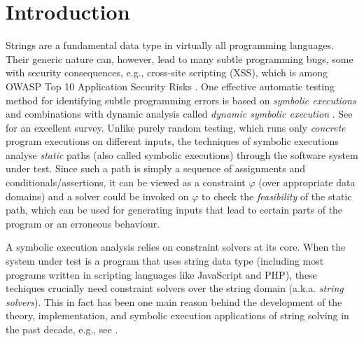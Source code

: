 
\section{Introduction}
\label{sec:intro}

\vspace*{-2mm}

Strings are a fundamental data type in virtually all programming languages.
Their generic nature can, however, lead to many subtle programming 
bugs, some with security consequences, e.g., cross-site scripting
(XSS), which is among OWASP Top 10 Application Security Risks
\cite{owasp17}. One effective
automatic testing method for identifying subtle programming errors
is based on \emph{symbolic executions} 
\cite{king76} and combinations with dynamic analysis
called \emph{dynamic symbolic execution} \cite{jalangi,DART,EXE,CUTE,KLEE}.
See \cite{symbex-survey} for an excellent survey. Unlike purely random testing,
which runs only \emph{concrete} program executions on different 
inputs, the techniques of symbolic executions analyse \emph{static} paths
(also called symbolic executions) through the software system under test.
Since such a path is simply a sequence of assignments and
conditionals/assertions, it can be viewed as a constraint $\varphi$ (over 
appropriate data domains) and a 
solver could be invoked on $\varphi$ to check the \emph{feasibility}
of the static path, which can be used for generating inputs that lead to 
certain parts of the program or an erroneous behaviour.

A symbolic execution analysis relies on constraint solvers at its core. When 
the system
under test is a program that uses string data type (including most programs 
written in scripting languages like JavaScript and PHP), these techiques 
crucially need constraint solvers over the string domain (a.k.a. \emph{string 
solvers}). This in fact has been one main reason behind the development of
the theory, implementation, and symbolic execution applications of string 
solving in the past decade, e.g., see 
\cite{BTV09,Berkeley-JavaScript,HAMPI,Stranger,Vijay-length,YABI14,Abdulla14,LB16,fang-yu-circuits,Abdulla17,CCHLW18,HJLRV18,S3,TCJ16,Z3-str,Z3-str2,cvc4,Saner,RVG12,jalangi,expose}.

